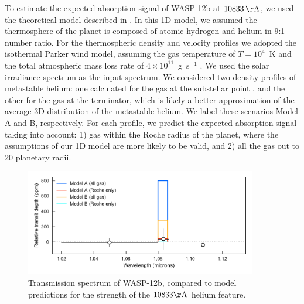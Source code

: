\documentclass[RNAAS]{aastex62}
\begin{document}
To estimate the expected absorption signal of WASP-12b at $10833\,\mathrm{\AA}$,
we used the theoretical model described in \cite{oklopcic18}.
In this 1D model, we assumed the thermosphere of the planet is composed of atomic hydrogen and helium in 9:1 number
ratio. For the thermospheric density and velocity profiles we adopted the
isothermal Parker wind model, assuming the gas temperature of $T=10^4$~K and the
total atmospheric mass loss rate of $4\times 10^{11}$~g~s$^{-1}$ \citep[based on
the results of hydrodynamic simulations of atmospheric escape in WASP-12b
by][]{salz16}. We used the solar irradiance spectrum as the input spectrum. 
We considered two density profiles of metastable helium: one calculated for the
gas at the substellar point \citep[as in][]{oklopcic18}, and the other for the
gas at the terminator, which is likely a better approximation of the average 3D
distribution of the metastable helium. We label these scenarios Model A and B,
respectively. For each profile, we predict the expected absorption signal taking into account: 1) gas within the Roche radius of the planet, where the assumptions of our 1D model are more likely to be valid, and 2) all the gas out to 20 planetary radii. 

\begin{figure}[b!]
\begin{centering}
\includegraphics[width = 0.9\textwidth]{Figures/fig1.pdf}
\caption{Transmission spectrum of WASP-12b, compared to model predictions for
the strength of the $10833\mathrm{\AA}$ helium feature.}
\end{centering}
\label{fig:spectrum}
\end{figure}

\end{document}
